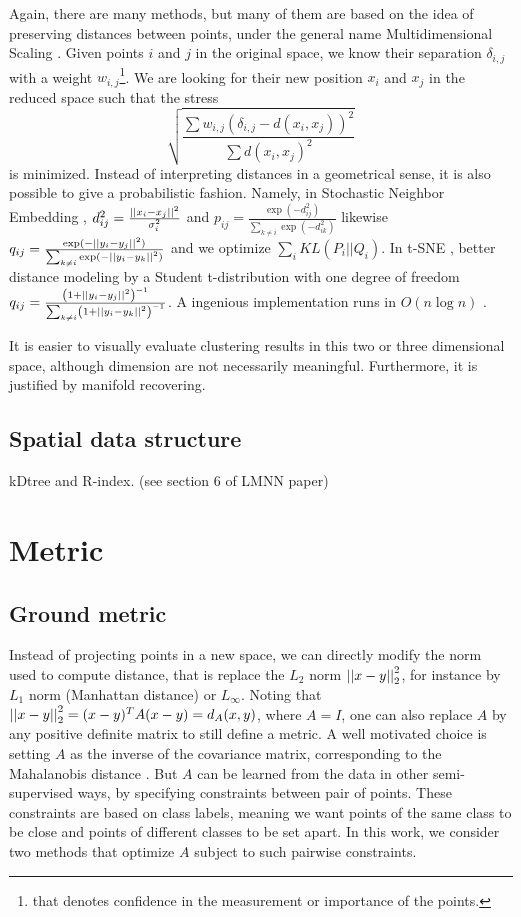 Again, there are many methods, but many of them are based on the idea of preserving distances between points, under the general name Multidimensional Scaling \autocite{MDS77}. Given points $i$ and $j$ in the original space, we know their separation $\delta_{i,j}$ with a weight $w_{i,j}$\footnote{that denotes confidence in the measurement or importance of the points.}. We are looking for their new position $x_i$ and $x_j$ in the reduced space such that the stress \[
\sqrt{\frac{\sum w_{i,j}(\delta_{i,j} - d(x_i, x_j))^2}{\sum  d(x_i, x_j)^2}} \] is minimized. Instead of interpreting distances in a geometrical sense, it is also possible to give a probabilistic fashion. Namely, in Stochastic Neighbor Embedding \autocite{SNE02}, $d^2_{ij} = \frac{\left|\left|x_i - x_j\right|\right|^2}{\sigma^2_i}$  and
$p_{ij} = \frac{\exp(-d_{ij}^2)}{\sum_{k \neq i}\exp(-d_{ik}^2)}$ likewise
$q_{ij} = \frac{\exp(-\left|\left|y_i - y_j\right|\right|^2)}{\sum_{k \neq i}\exp(-\left|\left|y_i - y_k\right|\right|^2)}$ and we optimize $\sum_i KL(P_i || Q_i)$. In t-SNE \autocite{tSNE08}, better distance modeling by a Student t-distribution with one degree of freedom
$q_{ij} = \frac{\left(1+\left|\left|y_i - y_j\right|\right|^2\right)^{-1}}{\sum_{k \neq i}\left(1+\left|\left|y_i - y_k\right|\right|^2\right)^{-1}}$. A ingenious implementation runs in $O(n\log n)$ \autocite{BarnesHut13}.

It is easier to visually evaluate clustering results in this two or three dimensional space, although dimension are not necessarily meaningful. Furthermore, it is justified by manifold recovering.

\subsection{Spatial data structure}
kDtree and R-index. (see section 6 of LMNN paper)

\section{Metric}

\subsection{Ground metric}

Instead of projecting points in a new space, we can directly modify the norm used to compute distance, that is replace the $L_2$ norm $\left|\left|x-y\right|\right|_2^2$, for instance by $L_1$ norm (Manhattan distance) or $L_\infty$. Noting that $\left|\left|x-y\right|\right|_2^2 = (x-y)^T A (x-y) = d_A(x,y)$, where $A=I$, one can also replace $A$ by any positive definite matrix to still define a metric. A well motivated choice is setting $A$ as the inverse of the covariance matrix, corresponding to the Mahalanobis distance \autocite{Mahalanobis36}. But $A$ can be learned from the data in other semi-supervised ways, by specifying constraints between pair of points. These constraints are based on class labels, meaning we want points of the same class to be close and points of different classes to be set apart. In this work, we consider two methods that optimize $A$ subject to such pairwise constraints.

